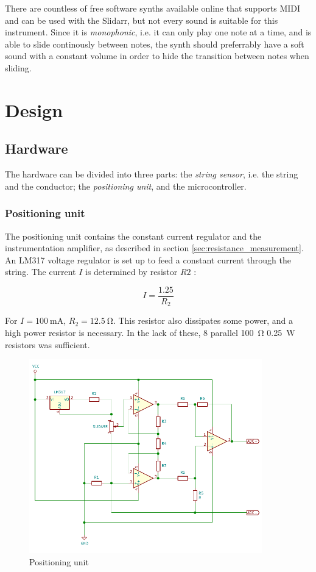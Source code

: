 \documentclass{article}
\begin{document}
There are countless of free software synths available online that supports MIDI and can be used with the Slidarr, but not every sound is suitable for this instrument. Since it is \textit{monophonic}, i.e. it can only play one note at a time, and is able to slide continously between notes, the synth should preferrably have a soft sound with a constant volume in order to hide the transition between notes when sliding.

\section{Design}

\subsection{Hardware}

The hardware can be divided into three parts: the \textit{string sensor}, i.e. the string and the conductor; the \textit{positioning unit}, and the microcontroller.

\subsubsection{Positioning unit}
The positioning unit contains the constant current regulator and the instrumentation amplifier, as described in section \ref{sec:resistance_measurement}. An LM317 voltage regulator is set up to feed a constant current through the string. The current $I$ is determined by resistor $R2$ \cite{lm317}:

$$ I = \frac{1.25}{R_2} $$

For $ I = \SI{100}{\milli\ampere} $, $R_2 = \SI{12.5}{\ohm} $. This resistor also dissipates some power, and a high power resistor is necessary. In the lack of these, 8 parallel \SI{100}{\ohm} \SI{0.25}{\watt} resistors was sufficient.

\begin{figure}[h]
  \centering
  \includegraphics[width=0.9\textwidth]{slidarr-circuit}
  \caption{Positioning unit}
  \label{fig:slidarr-circuit}
\end{figure}
\end{document}
